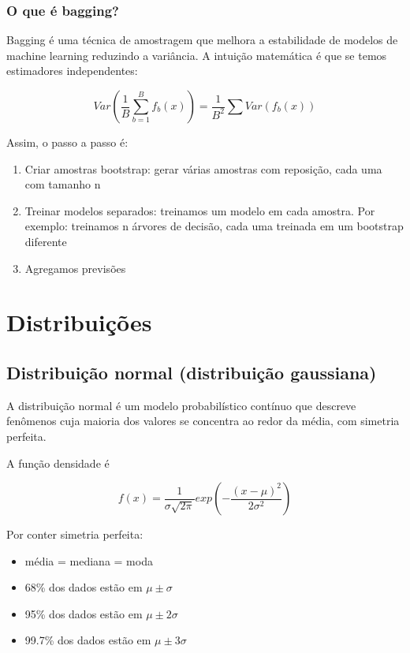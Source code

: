 \documentclass{article}
\begin{document}
\subsubsection{O que é bagging?}

Bagging é uma técnica de amostragem que melhora a estabilidade de modelos de machine learning reduzindo a variância. A intuição matemática é que se temos estimadores independentes:

\begin{equation*}
    Var\left(\frac{1}{B} \sum_{b =1}^{B} f_b(x)\right) = \frac{1}{B^2}\sum Var(f_b(x))
\end{equation*}

Assim, o passo a passo é:

\begin{enumerate}
    \item Criar amostras bootstrap: gerar várias amostras com reposição, cada uma com tamanho n
    \item Treinar modelos separados: treinamos um modelo em cada amostra. Por exemplo: treinamos n árvores de decisão, cada uma treinada em um bootstrap diferente
    \item Agregamos previsões
\end{enumerate}

\section{Distribuições}

\subsection{Distribuição normal (distribuição gaussiana)}

A distribuição normal é um modelo probabilístico contínuo que descreve fenômenos cuja maioria dos valores se concentra ao redor da média, com simetria perfeita.

A função densidade é 

\begin{equation}
    f(x) = \frac{1}{\sigma \sqrt{2\pi}}exp\left(-\frac{(x - \mu)^2}{2\sigma^2} \right)
\end{equation}

Por conter simetria perfeita:

\begin{itemize}
    \item média = mediana = moda
    \item 68\% dos dados estão em $\mu \pm \sigma$
    \item 95\% dos dados estão em $\mu \pm 2\sigma$
    \item 99.7\% dos dados estão em $\mu \pm 3\sigma$
\end{itemize}
\end{document}

